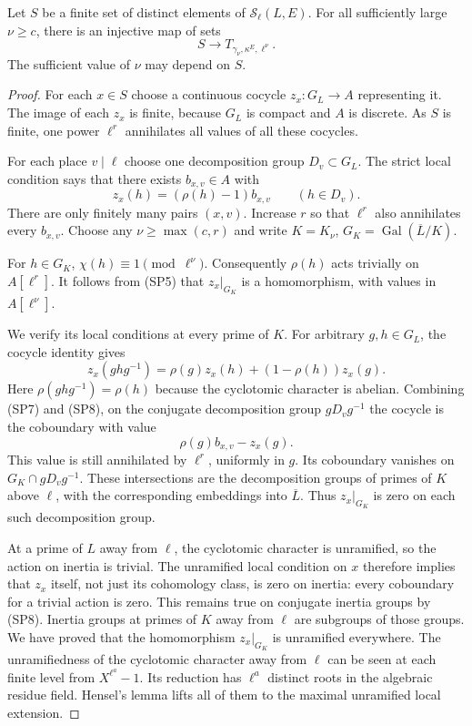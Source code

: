 \begin{lemma}\label{sp-finite-level}
Let $S$ be a finite set of distinct elements of
$\mathcal S_\ell(L,E)$.  For all sufficiently large
$\nu\ge c$, there is an injective map of sets
\[
                    S\longrightarrow
                    T_{\gamma_\nu,\kappa^E,\ell^\nu}.
                    \tag{SP6}
\]
The sufficient value of $\nu$ may depend on $S$.
\end{lemma}
\begin{proof}
For each $x\in S$ choose a continuous cocycle
$z_x:G_L\to A$ representing it.
The image of each $z_x$ is finite, because $G_L$ is compact
and $A$ is discrete.  As $S$ is finite, one power
$\ell^r$ annihilates all values of all these cocycles.

For each place $v\mid\ell$ choose one decomposition group
$D_v\subset G_L$.  The strict local condition says that
there exists $b_{x,v}\in A$ with
\[
                 z_x(h)=(\rho(h)-1)b_{x,v}
                         \qquad(h\in D_v).
                 \tag{SP7}
\]
There are only finitely many pairs $(x,v)$.
Increase $r$ so that $\ell^r$ also annihilates every
$b_{x,v}$.  Choose any $\nu\ge\max(c,r)$ and write
$K=K_\nu$, $G_K=\operatorname{Gal}(\overline L/K)$.

For $h\in G_K$, $\chi(h)\equiv1\pmod{\ell^\nu}$.
Consequently $\rho(h)$ acts trivially on $A[\ell^r]$.
It follows from (SP5) that $z_x|_{G_K}$ is a homomorphism,
with values in $A[\ell^\nu]$.

We verify its local conditions at every prime of $K$.
For arbitrary $g,h\in G_L$, the cocycle identity gives
\[
 z_x(ghg^{-1})
       =\rho(g)z_x(h)+(1-\rho(h))z_x(g).
       \tag{SP8}
\]
Here $\rho(ghg^{-1})=\rho(h)$ because the cyclotomic
character is abelian.  Combining (SP7) and (SP8), on the
conjugate decomposition group $gD_vg^{-1}$ the cocycle
is the coboundary with value
\[
                          \rho(g)b_{x,v}-z_x(g).
\]
This value is still annihilated by $\ell^r$, uniformly
in $g$.  Its coboundary vanishes on
$G_K\cap gD_vg^{-1}$.  These intersections are the
decomposition groups of primes of $K$ above $\ell$,
with the corresponding embeddings into $\overline L$.
Thus $z_x|_{G_K}$ is zero on each such decomposition group.

At a prime of $L$ away from $\ell$, the cyclotomic character
is unramified, so the action on inertia is trivial.
The unramified local condition on $x$ therefore implies
that $z_x$ itself, not just its cohomology class, is zero
on inertia: every coboundary for a trivial action is zero.
This remains true on conjugate inertia groups by (SP8).
Inertia groups at primes of $K$ away from $\ell$ are
subgroups of those groups.  We have proved that the
homomorphism $z_x|_{G_K}$ is unramified everywhere.
The unramifiedness of the cyclotomic character away from
$\ell$ can be seen at each finite level from
$X^{\ell^a}-1$.  Its reduction has $\ell^a$ distinct roots
in the algebraic residue field.  Hensel's lemma lifts all
of them to the maximal unramified local extension.


\end{proof}
